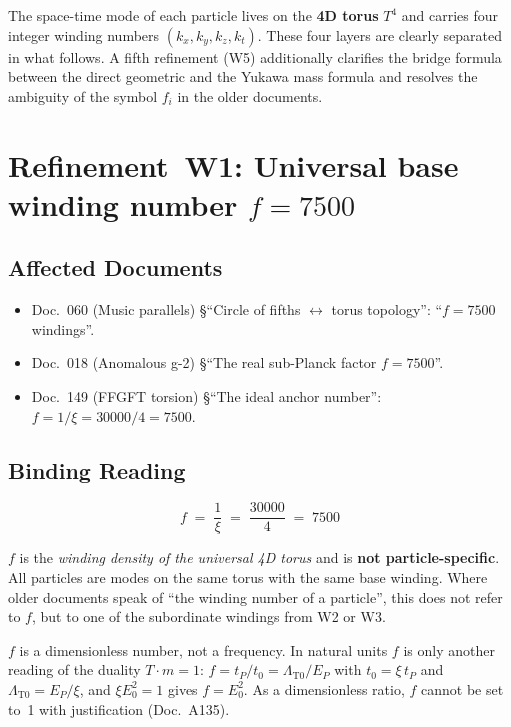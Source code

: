 The space-time mode of each particle lives on the \textbf{4D torus}
$T^4$ and carries four integer winding numbers $(k_x, k_y, k_z, k_t)$.
These four layers are clearly separated in what follows. A fifth
refinement (W5) additionally clarifies the bridge formula between the
direct geometric and the Yukawa mass formula and resolves the
ambiguity of the symbol $f_i$ in the older documents.

\section{\texorpdfstring{Refinement~W1: Universal base winding number $f = 7500$}{Refinement W1: Universal base winding number f = 7500}}

\subsection*{Affected Documents}

\begin{itemize}
  \item Doc.~060 (Music parallels) §\enquote{Circle of fifths
        $\leftrightarrow$ torus topology}: \enquote{$f = 7500$ windings}.
  \item Doc.~018 (Anomalous g-2) §\enquote{The real sub-Planck factor
        $f = 7500$}.
  \item Doc.~149 (FFGFT torsion) §\enquote{The ideal anchor number}:
        $f = 1/\xi = 30000/4 = 7500$.
\end{itemize}

\subsection*{Binding Reading}

\begin{equation}
  \boxed{\;f \;=\; \frac{1}{\xi} \;=\; \frac{30000}{4} \;=\; 7500\;}
  \tag{210.1}
\end{equation}

$f$ is the \emph{winding density of the universal 4D torus} and is
\textbf{not particle-specific}. All particles are modes on the same
torus with the same base winding. Where older documents speak of
\enquote{the winding number of a particle}, this does not refer to
$f$, but to one of the subordinate windings from W2 or W3.

$f$ is a dimensionless number, not a frequency. In natural units $f$
is only another reading of the duality $T\cdot m = 1$:
$f = t_P/t_0 = \Lambda_{\text{T0}}/E_P$ with $t_0 = \xi\,t_P$ and
$\Lambda_{\text{T0}} = E_P/\xi$, and $\xi E_0^2 = 1$ gives
$f = E_0^2$. As a dimensionless ratio, $f$ cannot be set to~1 with
justification (Doc.~A135).


